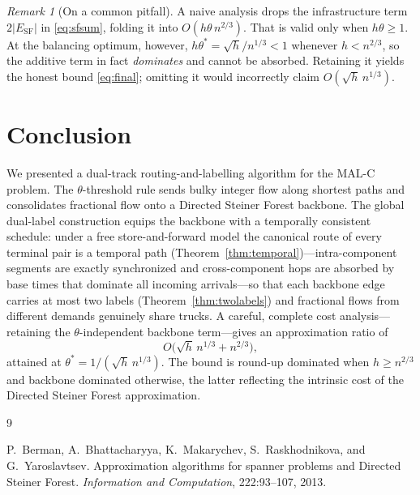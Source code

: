 \documentclass[11pt]{article}
\theoremstyle{definition}
\theoremstyle{remark}
\newtheorem{remark}{Remark}
\newcommand{\ESF}{E_{\mathrm{SF}}}
\begin{document}
\begin{remark}[On a common pitfall]
A naive analysis drops the infrastructure term $2|\ESF|$ in \eqref{eq:sfsum}, folding it into
$O(h\theta\,n^{2/3})$. That is valid only when $h\theta\ge 1$. At the balancing optimum, however,
$h\theta^\ast=\sqrt{h}/n^{1/3}<1$ whenever $h<n^{2/3}$, so the additive term in fact \emph{dominates}
and cannot be absorbed. Retaining it yields the honest bound \eqref{eq:final}; omitting it would
incorrectly claim $O(\sqrt{h}\,n^{1/3})$.
\end{remark}

\section{Conclusion}

We presented a dual-track routing-and-labelling algorithm for the MAL-C problem. The
$\theta$-threshold rule sends bulky integer flow along shortest paths and consolidates fractional
flow onto a Directed Steiner Forest backbone. The global dual-label construction equips the backbone
with a temporally consistent schedule: under a free store-and-forward model the canonical route of
every terminal pair is a temporal path (Theorem~\ref{thm:temporal})---intra-component segments are
exactly synchronized and cross-component hops are absorbed by base times that dominate all incoming
arrivals---so that each backbone edge carries at most two labels (Theorem~\ref{thm:twolabels}) and
fractional flows from different demands genuinely share trucks. A careful, complete cost
analysis---retaining the $\theta$-independent backbone term---gives an approximation ratio of
\[
  O\!\big(\sqrt{h}\,n^{1/3}+n^{2/3}\big),
\]
attained at $\theta^\ast=1/(\sqrt{h}\,n^{1/3})$. The bound is round-up dominated when $h\ge n^{2/3}$
and backbone dominated otherwise, the latter reflecting the intrinsic cost of the Directed Steiner
Forest approximation.

\begin{thebibliography}{9}

P.~Berman, A.~Bhattacharyya, K.~Makarychev, S.~Raskhodnikova, and G.~Yaroslavtsev.
\newblock Approximation algorithms for spanner problems and Directed Steiner Forest.
\newblock \emph{Information and Computation}, 222:93--107, 2013.

\end{thebibliography}
\end{document}
